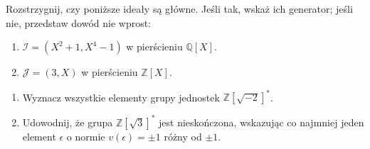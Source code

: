 \begin{problem}
    Rozstrzygnij, czy poniższe ideały są główne. Jeśli tak, wskaż ich generator; jeśli nie, przedstaw dowód nie wprost:
    \begin{enumerate}
        \item $\mathcal{I} = (X^2 + 1, X^4 - 1)$ w pierścieniu $\mathbb{Q}[X]$.
        \item $\mathcal{J} = (3, X)$ w pierścieniu $\mathbb{Z}[X]$.
    \end{enumerate}
\end{problem}

\begin{problem}[4: Jednostki]
    \begin{enumerate}
        \item Wyznacz wszystkie elementy grupy jednostek $\mathbb{Z}[\sqrt{-2}]^{\ast}$.
        \item Udowodnij, że grupa $\mathbb{Z}[\sqrt{3}]^{\ast}$ jest nieskończona, wskazując co najmniej jeden element $\epsilon$ o normie $v(\epsilon) = \pm 1$ różny od $\pm 1$.
    \end{enumerate}
\end{problem}
